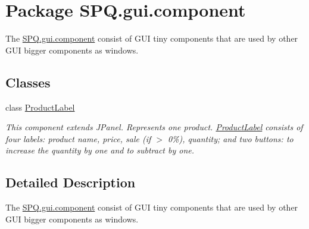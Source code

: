 \hypertarget{namespace_s_p_q_1_1gui_1_1component}{}\section{Package S\+P\+Q.\+gui.\+component}
\label{namespace_s_p_q_1_1gui_1_1component}


The \mbox{\hyperlink{namespace_s_p_q_1_1gui_1_1component}{S\+P\+Q.\+gui.\+component}} consist of G\+UI tiny components that are used by other G\+UI bigger components as windows.  


\subsection*{Classes}
\begin{DoxyCompactItemize}
\item 
class \mbox{\hyperlink{class_s_p_q_1_1gui_1_1component_1_1_product_label}{Product\+Label}}
\begin{DoxyCompactList}\small\item\em This component extends J\+Panel. Represents one product. \mbox{\hyperlink{class_s_p_q_1_1gui_1_1component_1_1_product_label}{Product\+Label}} consists of four labels\+: product name, price, sale (if $>$ 0\%), quantity; and two buttons\+: to increase the quantity by one and to subtract by one. \end{DoxyCompactList}\end{DoxyCompactItemize}


\subsection{Detailed Description}
The \mbox{\hyperlink{namespace_s_p_q_1_1gui_1_1component}{S\+P\+Q.\+gui.\+component}} consist of G\+UI tiny components that are used by other G\+UI bigger components as windows. 